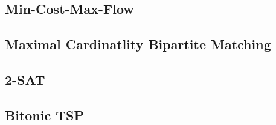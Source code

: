 \subsection{Min-Cost-Max-Flow}


\subsection{Maximal Cardinatlity Bipartite Matching}\label{kuhn}



\subsection{2-SAT}


% 

\subsection{Bitonic TSP}


